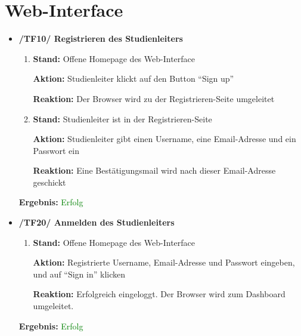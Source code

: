 \documentclass[a4paper]{scrreprt}
\begin{document}
	      \section{Web-Interface}
		      \begin{itemize}
		          \item \textbf{/TF10/ Registrieren des Studienleiters}
		          \begin{enumerate}
		               \item \par \textbf{Stand: }Offene Homepage des Web-Interface
		                \par \textbf{Aktion: }Studienleiter klickt auf den Button ``Sign up''
		                \par \textbf{Reaktion: }Der Browser wird zu der Registrieren-Seite umgeleitet
			            \item \par \textbf{Stand: }Studienleiter ist in der Registrieren-Seite
		                \par \textbf{Aktion: }Studienleiter gibt einen Username, eine Email-Adresse und ein Passwort ein
		                \par \textbf{Reaktion: }Eine Bestätigungsmail wird nach dieser Email-Adresse geschickt
		           \end{enumerate}
		           \vspace*{0.3cm}
		           \par \textbf{Ergebnis: }\textcolor{green}{Erfolg}
		           \vspace*{0.6cm}
		           
                    \item \textbf{/TF20/ Anmelden des Studienleiters}
                        \begin{enumerate}
                            \item \par \textbf{Stand: }Offene Homepage des Web-Interface
                                \par \textbf{Aktion: }Registrierte Username, Email-Adresse und Passwort eingeben, und auf “Sign in” klicken
                                \par \textbf{Reaktion: }Erfolgreich eingeloggt. Der Browser wird zum Dashboard umgeleitet.
                        \end{enumerate}		         
		           \vspace*{0.3cm}
		           \par \textbf{Ergebnis: }\textcolor{green}{Erfolg}
		           \vspace*{0.6cm}  
		       

\end{itemize}
\end{document}
